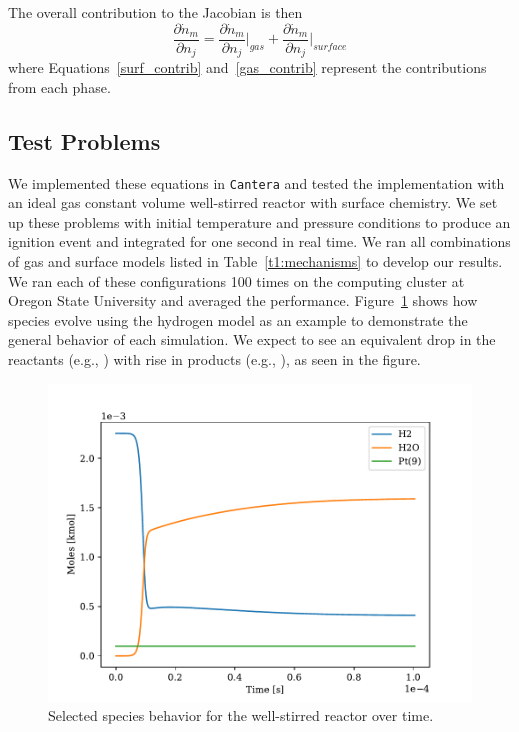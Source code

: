 \documentclass[12pt]{ussci}
\def\cantera{\texttt{Cantera}}
\def\cantera{\texttt{Cantera}}
\begin{document}
The overall contribution to the Jacobian is then
\begin{equation}
    \frac{\partial \dot{n}_{m}}{\partial n_j} = \frac{\partial \dot{n}_{m}}{\partial n_j}\Big\vert_{gas} + \frac{\partial \dot{n}_{m}}{\partial n_j}\Big\vert_{surface}
\end{equation}
where Equations~\eqref{surf_contrib} and~\eqref{gas_contrib} represent the contributions from each phase.

\subsection{Test Problems}
\label{sec:test-problems}

We implemented these equations in \cantera{} and tested the implementation with an ideal gas constant volume well-stirred reactor with surface chemistry.
We set up these problems with initial temperature and pressure conditions to produce an ignition event and integrated for one second in real time.
We ran all combinations of gas and surface models listed in Table~\ref{t1:mechanisms} to develop our results.
We ran each of these configurations 100 times on the computing cluster at Oregon State University and averaged the performance.
Figure~\ref{fig:wsr} shows how species evolve using the hydrogen model as an example to demonstrate the general behavior of each simulation.
We expect to see an equivalent drop in the reactants (e.g., ) with rise in products (e.g., ), as seen in the figure.

\begin{figure}[htbp]
    \centering
    \includegraphics[scale=0.65]{figures/wsr_hydrogen.pdf}
    \caption{Selected species behavior for the well-stirred reactor over time.}
    \label{fig:wsr}
\end{figure}
\end{document}
